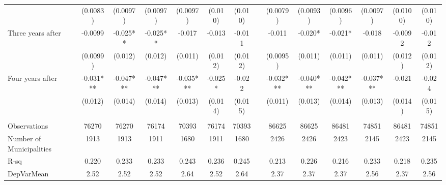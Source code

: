 \begin{tabular}{lccccccccccccc}
      & (0.0083) & (0.0097) & (0.0097) & (0.0097) & (0.010) & (0.010) &       & (0.0079) & (0.0093) & (0.0096) & (0.0097) & (0.0100) & (0.010) \\
Three years after & -0.0099 & -0.025** & -0.025** & -0.017 & -0.013 & -0.011 &       & -0.011 & -0.020* & -0.021* & -0.018 & -0.0092 & -0.012 \\
      & (0.0099) & (0.012) & (0.012) & (0.011) & (0.012) & (0.012) &       & (0.0095) & (0.011) & (0.011) & (0.011) & (0.012) & (0.012) \\
Four years after & -0.031*** & -0.047*** & -0.047*** & -0.035*** & -0.025* & -0.022 &       & -0.032*** & -0.040*** & -0.042*** & -0.037*** & -0.021 & -0.024 \\
      & (0.012) & (0.014) & (0.014) & (0.013) & (0.014) & (0.015) &       & (0.011) & (0.013) & (0.014) & (0.013) & (0.014) & (0.015) \\
      &       &       &       &       &       &       &       &       &       &       &       &       &  \\
\midrule
Observations & 76270 & 76270 & 76174 & 70393 & 76174 & 70393 &       & 86625 & 86625 & 86481 & 74851 & 86481 & 74851 \\
Number of Municipalities & 1913  & 1913  & 1911  & 1680  & 1911  & 1680  &       & 2426  & 2426  & 2423  & 2145  & 2423  & 2145 \\
R-sq  & 0.220 & 0.233 & 0.233 & 0.243 & 0.236 & 0.245 &       & 0.213 & 0.226 & 0.216 & 0.233 & 0.218 & 0.235 \\
DepVarMean & 2.52  & 2.52  & 2.52  & 2.64  & 2.52  & 2.64  &       & 2.37  & 2.37  & 2.37  & 2.56  & 2.37  & 2.56 \\
\bottomrule
\bottomrule
\end{tabular}%
